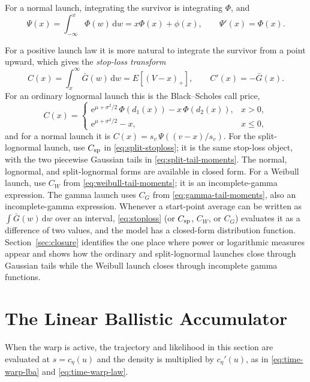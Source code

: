 \documentclass[12pt]{article}
\newcommand{\dd}{\,\mathrm{d}}
\newcommand{\PhiN}{\Phi}
\newcommand{\phiN}{\phi}
\newcommand{\Gbar}{\bar{G}}
\newcommand{\e}{\mathrm{e}}
\theoremstyle{remark}
\begin{document}
For a normal launch, integrating the survivor is integrating $\PhiN$, and
\begin{equation}
  \Psi(x) = \int_{-\infty}^{x} \PhiN(w) \dd w = x\PhiN(x) + \phiN(x),
  \qquad \Psi'(x) = \PhiN(x).
  \label{eq:psi}
\end{equation}

For a positive launch law it is more natural to integrate the survivor from a point upward, which gives the \emph{stop-loss transform}
\begin{equation}
  C(x) = \int_{x}^{\infty} \Gbar(w) \dd w = E\!\left[(V-x)_+\right],
  \qquad C'(x) = -\Gbar(x).
  \label{eq:stoploss}
\end{equation}
For an ordinary lognormal launch this is the Black--Scholes call price,
\begin{equation}
  C(x) =
  \begin{cases}
    \e^{\mu + \sigma^2/2}\,\PhiN\!\left(d_1(x)\right)
      - x\,\PhiN\!\left(d_2(x)\right), & x>0,\\[4pt]
    \e^{\mu + \sigma^2/2}-x, & x\le0,
  \end{cases}
  \label{eq:bs}
\end{equation}
and for a normal launch it is $C(x) = s_v\,\Psi\!\left((v-x)/s_v\right)$. For the split-lognormal launch, use $C_{\rm sp}$ in
\eqref{eq:split-stoploss}; it is the same stop-loss object, with the two
piecewise Gaussian tails in \eqref{eq:split-tail-moments}. The normal, lognormal, and split-lognormal forms are available in closed form. For a Weibull launch, use $C_W$ from
\eqref{eq:weibull-tail-moments}; it is an incomplete-gamma expression. The gamma launch uses $C_G$ from \eqref{eq:gamma-tail-moments}, also an incomplete-gamma expression. Whenever
a start-point average can be written as $\int \Gbar(w)\dd w$ over an interval, \eqref{eq:stoploss} (or $C_{\rm sp}$, $C_W$, or $C_G$) evaluates it as a difference of two values, and the model has a closed-form distribution function. Section~\ref{sec:closure} identifies the one place where power or logarithmic measures appear and shows how the ordinary and split-lognormal launches close through Gaussian tails while the Weibull launch closes through incomplete gamma functions.

\section{The Linear Ballistic Accumulator}
When the warp is active, the trajectory and likelihood in this section are evaluated at \(s=c_\eta(u)\) and the density is multiplied by \(c_\eta'(u)\), as in \eqref{eq:time-warp-lba} and
\eqref{eq:time-warp-law}.
\end{document}
